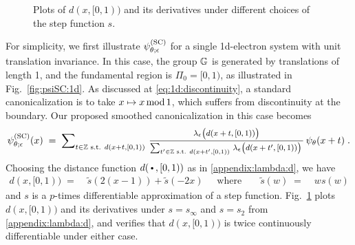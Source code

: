 \begin{figure}[t]
    \vspace{-.5em}
    \centering
    \vspace{-2.5em}
    \caption{Plots of $d(x,[0,1))$ and its derivatives under different choices of the step function $s$.}
    \label{fig:dist:1d}
\end{figure}

For simplicity, we first illustrate $\psi^{(\rm SC)}_{\theta;\epsilon}$ for a single 1d-electron system with unit translation invariance. In this case, the group $\mathbb{G}$ is generated by translations of length 1, and the fundamental region is $\Pi_0 = [0,1)$, as illustrated in Fig.~\ref{fig:psiSC:1d}. As discussed at \eqref{eq:1d:discontinuity}, a standard canonicalization is to take $x \mapsto x \,{\rm mod}\, 1$, which suffers from discontinuity at the boundary. Our proposed smoothed canonicalization in this case becomes 
\begin{align*}
    \psiSC_{\theta;\epsilon}(x) 
    \;=\; 
    \msum_{t \in \Z \textrm{ s.t. }  d(x+t, [0,1))} 
    \,
    \mfrac{ \lambda_\epsilon\big( d(x+t, [0,1)) \big)}{\sum_{t' \in \Z \textrm{ s.t. }  d(x+t', [0,1))}  \, \lambda_\epsilon\big(  d(x+t', [0,1)) \big) \,  } 
    \, 
    \psi_\theta( x + t) 
    \;.
\end{align*}
Choosing the distance function $d(\argdot, [0,1))$ as in \cref{appendix:lambda:d}, we have 
\begin{align*}
    d(x, [0,1)) \;=&\; \tilde s(2(x-1)) + \tilde s(-2x) \;
    &\text{ where }&&
    \tilde s(w) \;=&\; w s(w)
\end{align*}
and $s$ is a $p$-times differentiable approximation of a step function. Fig.~\ref{fig:dist:1d} plots $d(x, [0,1))$ and its derivatives under $s=s_\infty$ and $s=s_2$ from \cref{appendix:lambda:d}, and verifies that $d(x, [0,1))$ is twice continuously differentiable under either case.

\vspace{.2em}

